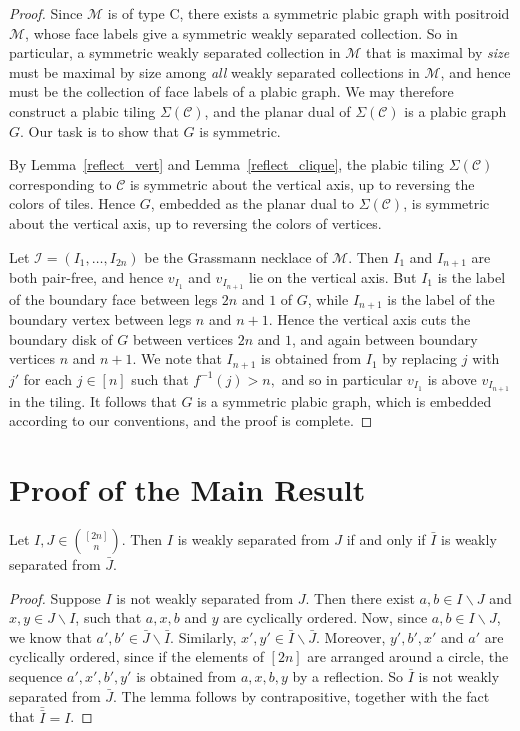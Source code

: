 \documentclass[ALCO,ThmDefs,Unicode,epreuves]{cedram}
\begin{document}
\begin{proof}
Since $\mathcal{M}$ is of type C, there exists a symmetric plabic graph with positroid $\mathcal{M}$, whose face labels give a symmetric weakly separated collection. So in particular, a symmetric weakly separated collection in $\mathcal{M}$ that is maximal by \emph{size} must be maximal by size among \emph{all} weakly separated collections in $\mathcal{M}$, and hence must be the collection of face labels of a plabic graph. We may therefore construct a plabic tiling $\Sigma(\mathcal{C})$, and the planar dual of $\Sigma(\mathcal{C})$ is a plabic graph $G$. Our task is to show that $G$ is symmetric.

By Lemma~\ref{reflect_vert} and Lemma~\ref{reflect_clique}, the plabic tiling $\Sigma(\mathcal{C})$ corresponding to $\mathcal{C}$ is symmetric about the vertical axis, up to reversing the colors of tiles. Hence $G$, embedded as the planar dual to $\Sigma(\mathcal{C})$, is symmetric about the vertical axis, up to reversing the colors of vertices. 

Let $\mathcal{I} = (I_1,\ldots,I_{2n})$ be the Grassmann necklace of $\mathcal{M}$. 
Then $I_1$ and $I_{n+1}$ are both pair-free, and hence
$v_{I_1}$ and $v_{I_{n+1}}$ lie on the vertical axis. But $I_{1}$ is the label of the boundary face between legs $2n$ and $1$ of $G$, while $I_{n+1}$ is the label of the boundary vertex between legs $n$ and $n+1$.
Hence the vertical axis cuts the boundary disk of $G$ between vertices $2n$ and $1$, and again between boundary vertices $n$ and $n+1$. We note that $I_{n+1}$ is obtained from $I_1$ by replacing $j$ with $j'$ for each 
$j \in [n]$ such that $f^{-1}(j) > n,$
and so in particular $v_{I_1}$ is above $v_{I_{n+1}}$ in the tiling. It follows that $G$ is a symmetric plabic graph, which is embedded according to our conventions, and the proof is complete. \end{proof}

\section{Proof of the Main Result}

\begin{lemm}\label{bar}
Let $I, J \in \binom{[2n]}{n}$. Then $I$ is weakly separated from $J$ if and only if $\bar{I}$ is weakly separated from $\bar{J}$.
\end{lemm}

\begin{proof}
Suppose $I$ is not weakly separated from $J$. Then there exist $a,b \in I\backslash J$ and $x,y \in J \backslash I$, such that $a,x,b$ and $y$ are cyclically ordered.
Now, since $a,b \in I \backslash J$, we know that $a',b' \in \bar{J} \backslash \bar{I}$. Similarly, $x',y' \in \bar{I} \backslash \bar{J}$. 
 Moreover, $y',b',x'$ and $a'$ are cyclically ordered, since if the elements of $[2n]$ are arranged around a circle, the sequence $a', x', b', y'$ is obtained from $a, x, b, y$ by a reflection.
So $\bar{I}$ is not weakly separated from $\bar{J}$. The lemma follows by contrapositive, together with the fact that $\bar{\bar{I}} = I$.\end{proof}
\end{document}
